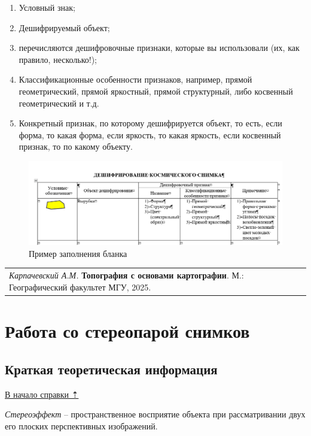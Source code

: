 \documentclass[
  12pt,
]{book}
\begin{document}
\begin{enumerate}
\def\labelenumi{\arabic{enumi})}
\item
  Условный знак;
\item
  Дешифрируемый объект;
\item
  перечисляются дешифровочные признаки, которые вы использовали (их, как правило, несколько!);
\item
  Классификационные особенности признаков, например, прямой геометрический, прямой яркостный, прямой структурный, либо косвенный геометрический и т.д.
\item
  Конкретный признак, по которому дешифрируется объект, то есть, если форма, то какая форма, если яркость, то какая яркость, если косвенный признак, то по какому объекту.
\end{enumerate}

\begin{figure}
\centering
\includegraphics{images/Interpretation/Blank_Example.png}
\caption{Пример заполнения бланка}
\end{figure}

\begin{longtable}[]{@{}l@{}}
\toprule\noalign{}
\endhead
\bottomrule\noalign{}
\endlastfoot
\emph{Карпачевский А.М.} \textbf{Топография с основами картографии}. М.: Географический факультет МГУ, 2025. \\
\end{longtable}

\chapter{Работа со стереопарой снимков}\label{stereo}

\section{Краткая теоретическая информация}\label{stereo-theory}

\hyperref[stereo]{В начало справки ⇡}

\emph{Стереоэффект} -- пространственное восприятие объекта при рассматривании двух его плоских перспективных изображений.
\end{document}
